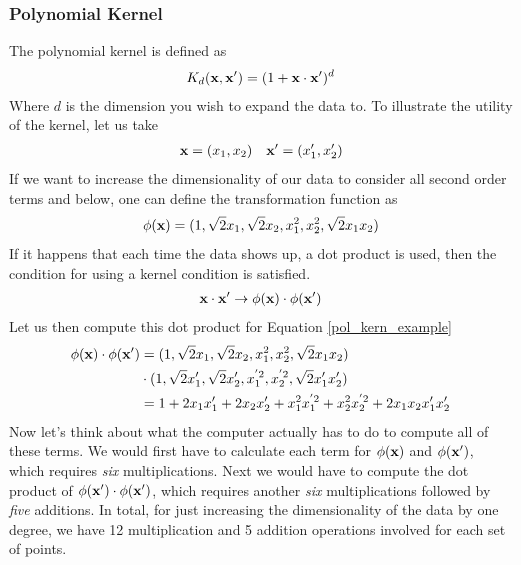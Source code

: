 \subsubsection{Polynomial Kernel}
The polynomial kernel is defined as
\begin{align}\label{pol_kern}
	K_d(\textbf{x},\textbf{x}') = (1+ \textbf{x}\cdot \textbf{x}')^d
\end{align}
Where $d$ is the dimension you wish to expand the data to. To illustrate the utility of the kernel, let us take
\begin{align}\label{pol_kern_example}
	\textbf{x} = (x_1,x_2) && \textbf{x}' = (x_1',x_2')
\end{align}
If we want to increase the dimensionality of our data to consider all second order terms and below, one can define the transformation function as
\begin{align}
	\phi(\textbf{x}) = (1, \sqrt{2}x_1, \sqrt{2}x_2, x_1^2, x_2^2, \sqrt{2}x_1x_2)
\end{align}
If it happens that each time the data shows up, a dot product is used, then the condition for using a kernel condition is satisfied.
\begin{align}
	\textbf{x}\cdot \textbf{x}' \rightarrow \phi(\textbf{x})\cdot \phi(\textbf{x}')
\end{align}
Let us then compute this dot product for Equation \ref{pol_kern_example}
\begin{align}
	\phi(\textbf{x})\cdot \phi(\textbf{x}') &= (1, \sqrt{2}x_1, \sqrt{2}x_2, x_1^2, x_2^2, \sqrt{2}x_1x_2) \\
	&\cdot (1, \sqrt{2}x_1', \sqrt{2}x_2', x_1^{'2}, x_2^{'2}, \sqrt{2}x_1'x_2')\\
	&= 1 + 2x_1x_1' + 2x_2x_2' + x_1^2x_1^{'2}+x_2^2x_2^{'2} + 2x_1x_2x_1'x_2' \label{pol_kern_expand}
\end{align}
Now let's think about what the computer actually has to do to compute all of these terms. We would first have to calculate each term for $\phi(\textbf{x})$ and $\phi(\textbf{x}')$, which requires \emph{six} multiplications. Next we would have to compute the dot product of $\phi(\textbf{x}')\cdot\phi(\textbf{x}')$, which requires another \emph{six} multiplications followed by \emph{five} additions. In total, for just increasing the dimensionality of the data by one degree, we have 12 multiplication and 5 addition operations involved for each set of points.

